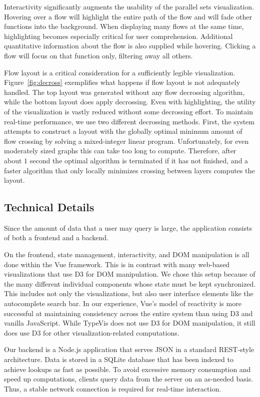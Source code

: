 \documentclass{vgtc}                          %
\begin{document}
Interactivity significantly augments the
usability of the parallel sets visualization.
Hovering over a flow will highlight the
entire path of the flow
and will fade other functions
into the background.
When displaying many flows at the same time,
highlighting becomes especially critical
for user comprehension.
Additional quantitative information
about the flow is also supplied
while hovering.
Clicking a flow will focus on that function
only, filtering away all others.

Flow layout is a critical consideration
for a sufficiently legible visualization.
Figure~\ref{fig:decross} exemplifies what
happens if flow layout is not adequately handled.
The top layout was generated without any
flow decrossing algorithm,
while the bottom layout does
apply decrossing.
Even with highlighting,
the utility of the visualization is vastly
reduced without some decrossing effort.
To maintain real-time performance,
we use two different decrossing methods.
First, the system attempts to construct
a layout with the globally optimal
minimum amount of flow crossing by
solving a mixed-integer linear program.
Unfortunately, for even moderately
sized graphs this can take too long to compute.
Therefore, after about $1$ second
the optimal algorithm is terminated
if it has not finished, and a faster
algorithm that only locally minimizes crossing
between layers computes the layout.

\subsection{Technical Details}

Since the amount of data that a user may query is large,
the application consists of both a frontend and a backend.

On the frontend, state management, interactivity,
and DOM manipulation is all done within the Vue framework.
This is in contrast with many web-based visualizations
that use D3 for DOM manipulation.
We chose this setup because of the many different
individual components whose state must be kept
synchronized.
This includes not only the visualizations, but also
user interface elements like the autocomplete search bar.
In our experience, Vue's model of reactivity is
more successful at maintaining consistency across the
entire system than using D3 and vanilla JavaScript.
While {\sc TypeVis} does not use D3 for DOM manipulation,
it still does use D3 for other visualization-related
computations.

Our backend is a Node.js application that serves
JSON in a standard REST-style architecture.
Data is stored in a SQLite database that has been
indexed to achieve lookups as fast as possible.
To avoid excessive memory consumption and speed up computations,
clients query data from the server on an as-needed basis.
Thus, a stable network connection is required for
real-time interaction.
\end{document}
